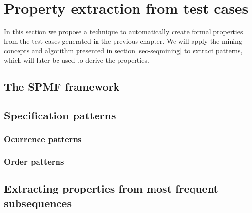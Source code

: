 \chapter{Property extraction from test cases}
\label{cap:propextract}

In this section we propose a technique to automatically create formal properties from the test cases generated in the previous chapter. We will apply the mining concepts and algorithm presented in section \ref{sec-seqmining} to extract patterns, which will later be used to derive the properties.



%


\section{The SPMF framework}

\section{Specification patterns}

\subsection{Ocurrence patterns}

\subsection{Order patterns}


\section{Extracting properties from most frequent subsequences}
